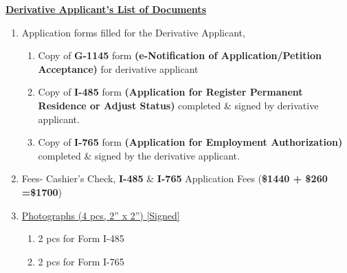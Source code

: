 %
%

\begin{center}
\underline{\textbf{Derivative Applicant's List of Documents}}
\end{center}
\begin{enumerate}[label=\textbf{ Exhibit-\arabic*},start=15]
        \item {Application forms filled for the Derivative Applicant,}\begin{enumerate}[label=\roman*.]
       
        \item Copy of \textbf{G-1145} form \textbf{(e-Notification of Application/Petition Acceptance)} for derivative applicant
         \item {Copy of \textbf{I-485} form \textbf{(Application for Register Permanent Residence or Adjust Status)} completed \& signed by derivative applicant.}
        \item Copy of \textbf{I-765} form \textbf{(Application for Employment Authorization)} completed \& signed by the derivative applicant.
    \end{enumerate}
    \item Fees- Cashier's Check, \textbf{I-485} \& \textbf{I-765} Application Fees (\textbf{\$1440 + \$260 =\$1700})
    
    \item \hyperref[mim_exhibit2]{Photographs (4 pcs, 2” x 2”) [Signed]} \begin{enumerate}[label=\roman*.]
        \item {2 pcs for Form I-485}
        \item {2 pcs for Form I-765}
    \end{enumerate}


\end{enumerate}

